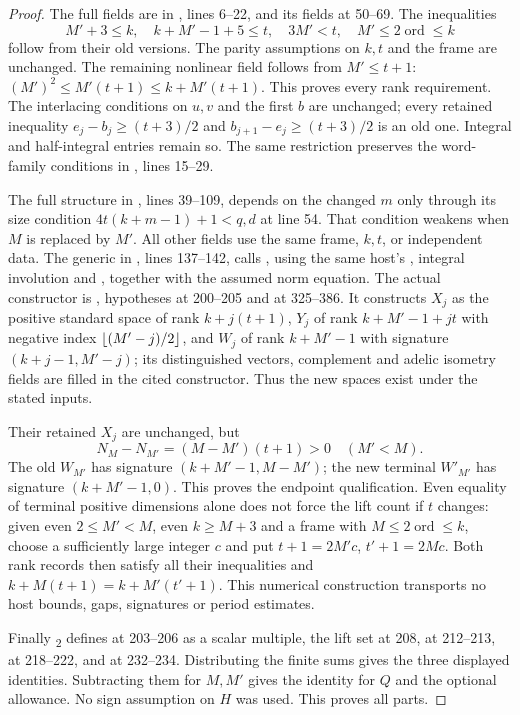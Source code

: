 \documentclass[11pt,a4paper]{article}
\theoremstyle{definition}\newtheorem{remark}[theorem]{Remark}
\begin{document}
\begin{proof}
The full  fields are in , lines 6--22, and its  fields at 50--69. The inequalities
\[
 M'+3\le k,\quad k+M'-1+5\le t,\quad 3M'<t,\quad
 M'\le2\operatorname{ord}\le k
\]
follow from their old versions. The parity assumptions on $k,t$ and the frame are unchanged. The remaining nonlinear field follows from $M'\le t+1$:
$(M')^2\le M'(t+1)\le k+M'(t+1)$.
This proves every rank requirement.
The interlacing conditions on $u,v$ and the first $b$ are unchanged; every retained inequality
$e_j-b_j\ge(t+3)/2$ and $b_{j+1}-e_j\ge(t+3)/2$ is an old one. Integral and half-integral entries remain so. The same restriction preserves the word-family conditions in , lines 15--29.

The full  structure in , lines 39--109, depends on the changed $m$ only through its size condition
$4t(k+m-1)+1<q,d$ at line 54. That condition weakens when $M$ is replaced by $M'$. All other fields use the same frame, $k,t$, or independent data.
The generic  in
, lines 137--142, calls , using the same host's , integral involution and , together with the assumed norm equation.
The actual constructor is , hypotheses at 200--205 and  at 325--386. It constructs $X_j$ as the positive standard space of rank $k+j(t+1)$, $Y_j$ of rank $k+M'-1+jt$ with negative index $\left\lfloor (M'-j)/2\right\rfloor$, and $W_j$ of rank $k+M'-1$ with signature $(k+j-1,M'-j)$; its distinguished vectors, complement and adelic isometry fields are filled in the cited constructor. Thus the new spaces exist under the stated inputs.

Their retained $X_j$ are unchanged, but
\[
 N_M-N_{M'}=(M-M')(t+1)>0\quad(M'<M).
\]
The old $W_{M'}$ has signature $(k+M'-1,M-M')$; the new terminal $W'_{M'}$ has signature $(k+M'-1,0)$. This proves the endpoint qualification.
Even equality of terminal positive dimensions alone does not force the lift count if $t$ changes: given even $2\le M'<M$, even $k\ge M+3$ and a frame with $M\le2\operatorname{ord}\le k$, choose a sufficiently large integer $c$ and put
$t+1=2M'c$, $t'+1=2Mc$.
Both rank records then satisfy all their inequalities and
$k+M(t+1)=k+M'(t'+1)$.
This numerical construction transports no host bounds, gaps, signatures or period estimates.

Finally \textsubscript{2} defines  at 203--206 as a scalar multiple, the lift set at 208,  at 212--213,  at 218--222, and  at 232--234. Distributing the finite sums gives the three displayed identities. Subtracting them for $M,M'$ gives the identity for $Q$ and the optional allowance. No sign assumption on $H$ was used. This proves all parts.
\end{proof}
\end{document}
